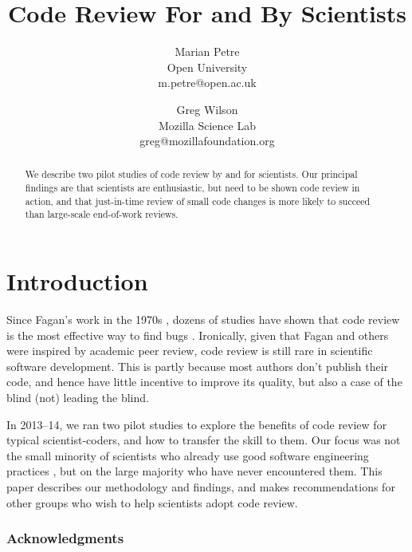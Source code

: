 \documentclass[10pt,twocolumn]{article}
\begin{document}
\title{Code Review For and By Scientists}
\author{
  Marian Petre \\ Open University \\ m.petre@open.ac.uk
  \and
  Greg Wilson \\ Mozilla Science Lab \\ greg@mozillafoundation.org
}

\maketitle

\begin{abstract}

We describe two pilot studies of code review by and for scientists.
Our principal findings are that scientists are enthusiastic,
but need to be shown code review in action,
and that just-in-time review of small code changes is more likely to succeed
than large-scale end-of-work reviews.

\end{abstract}

\section{Introduction}

Since Fagan's work in the 1970s \cite{b:fagan1976,b:fagan1986},
dozens of studies have shown that code review is
the most effective way to find bugs \cite{b:cohen2010,b:bacchelli2013}.
Ironically,
given that Fagan and others were inspired by academic peer review,
code review is still rare in scientific software development.
This is partly because most authors don't publish their code,
and hence have little incentive to improve its quality,
but also a case of the blind (not) leading the blind.

In 2013--14,
we ran two pilot studies to explore the benefits of code review for typical scientist-coders,
and how to transfer the skill to them.
Our focus was not the small minority of scientists who already use good software engineering practices \cite{b:hannay2009},
but on the large majority who have never encountered them.
This paper describes our methodology and findings,
and makes recommendations for other groups who wish to help scientists adopt code review.

\subsubsection*{Acknowledgments}
\end{document}
